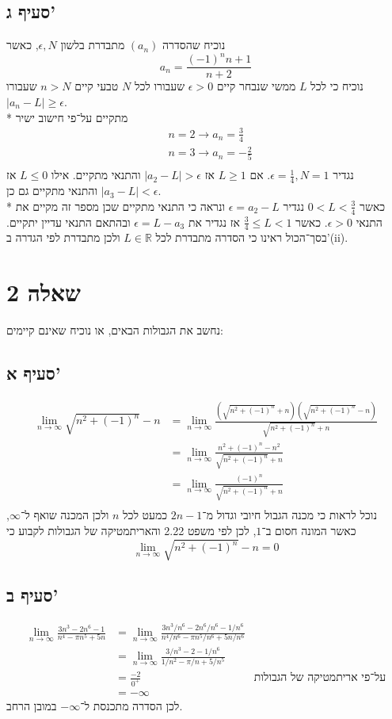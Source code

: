 \documentclass[a4paper]{article}
\def\RR{\mathbb{R}}
\begin{document}
\subsection{סעיף ג'}
נוכיח שהסדרה $(a_n)$ מתבדרת בלשון $\epsilon, N$, כאשר
\[
	a_n = \frac{{(-1)}^n n + 1}{n + 2}
\]
נוכיח כי לכל $L$ ממשי שנבחר קיים $\epsilon > 0$ שעבורו לכל $N$ טבעי קיים $n > N$ שעבורו $\left| a_n - L \right| \ge \epsilon$. \\*
מתקיים על־פי חישוב ישיר
\begin{align*}
	& n = 2 \rightarrow a_n = \frac{3}{4} \\
	& n = 3 \rightarrow a_n = -\frac{2}{5} \\
\end{align*}
נגדיר $\epsilon = \frac{1}{4}, N = 1$.
אם $L \ge 1$ אז $|a_2 - L| > \epsilon$ והתנאי מתקיים.
אילו $L \le 0$ אז $|a_3 - L| < \epsilon$ והתנאי מתקיים גם כן. \\*
כאשר $0 < L < \frac{3}{4}$ נגדיר $\epsilon = a_2 - L$ ונראה כי התנאי מתקיים שכן מספר זה מקיים את התנאי $\epsilon > 0$.
כאשר $\frac{3}{4} \le L < 1$ אז נגדיר את $\epsilon = L - a_3$ ובהתאם התנאי עדיין יתקיים.
בסך־הכול ראינו כי הסדרה מתבדרת לכל $L \in \RR$ ולכן מתבדרת לפי הגדרה ב'(ii).

\section{שאלה 2}
נחשב את הגבולות הבאים, או נוכיח שאינם קיימים:

\subsection{סעיף א'}
\begin{align*}
	\lim_{n \to \infty} \sqrt{n^2 + {(-1)}^n} - n
	& = \lim_{n \to \infty} \frac{\left(\sqrt{n^2 + {(-1)}^n} + n\right)\left(\sqrt{n^2 + {(-1)}^n} - n\right)}{\sqrt{n^2 + {(-1)}^n} + n} \\
	& = \lim_{n \to \infty} \frac{n^2 + {(-1)}^n - n^2}{\sqrt{n^2 + {(-1)}^n} + n} \\
	& = \lim_{n \to \infty} \frac{{(-1)}^n}{\sqrt{n^2 + {(-1)}^n} + n} \\
\end{align*}
נוכל לראות כי מכנה הגבול חיובי וגדול מ־$2n - 1$ כמעט לכל $n$ ולכן המכנה שואף ל־$\infty$, כאשר המונה חסום ב־$1$,
לכן לפי משפט 2.22 והאריתמטיקה של הגבולות לקבוע כי
\[
	\lim_{n \to \infty} \sqrt{n^2 + {(-1)}^n} - n = 0
\]

\subsection{סעיף ב'}
\begin{align*}
	\lim_{n \to \infty} \frac{3n^3 - 2n^6 - 1}{n^4 - \pi n^5 + 5n}
	& = \lim_{n \to \infty} \frac{3n^3/n^6 - 2n^6/n^6 - 1/n^6}{n^4/n^6 - \pi n^5/n^6 + 5n/n^6} \\
	& = \lim_{n \to \infty} \frac{3/n^3 - 2 - 1/n^6}{1/n^2 - \pi /n + 5/n^5} \\
	& = \frac{-2}{0^+} & \text{על־פי אריתמטיקה של הגבולות} \\
	& = -\infty
\end{align*}
לכן הסדרה מתכנסת ל־$-\infty$ במובן הרחב.
\end{document}
